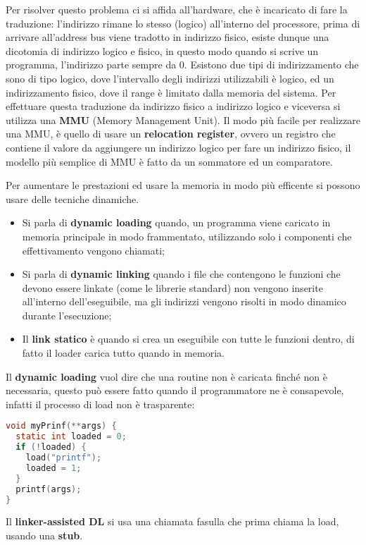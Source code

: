 \documentclass[12pt]{article}
\begin{document}
Per risolver questo problema ci si affida all'hardware, che \`e incaricato di fare la traduzione: l'indirizzo rimane lo stesso (logico) all'interno del processore, prima di arrivare all'address bus viene tradotto in indirizzo fisico, esiste dunque una dicotomia di indirizzo logico e fisico, in questo modo quando si scrive un programma, l'indirizzo parte sempre da 0. Esistono due tipi di indirizzamento che sono di tipo logico, dove l'intervallo degli indirizzi utilizzabili \`e logico, ed un indirizzamento fisico, dove il range \`e limitato dalla memoria del sistema. Per effettuare questa traduzione da indirizzo fisico a indirizzo logico e viceversa si utilizza una \textbf{MMU} (Memory Management Unit). Il modo pi\`u facile per realizzare una MMU, \`e quello di usare un \textbf{relocation register}, ovvero un registro che contiene il valore da aggiungere un indirizzo logico per fare un indirizzo fisico, il modello pi\`u semplice di MMU \`e fatto da un sommatore ed un comparatore.

Per aumentare le prestazioni ed usare la memoria in modo pi\`u efficente si possono usare delle tecniche dinamiche.
\begin{itemize}
  \item Si parla di \textbf{dynamic loading} quando, un programma viene caricato in memoria principale in modo frammentato, utilizzando solo i componenti che effettivamento vengono chiamati;
  \item Si parla di \textbf{dynamic linking} quando i file che contengono le funzioni che devono essere linkate (come le librerie standard) non vengono inserite all'interno dell'eseguibile, ma gli indirizzi vengono risolti in modo dinamico durante l'esecuzione;
  \item Il \textbf{link statico} \`e quando si crea un eseguibile con tutte le funzioni dentro, di fatto il loader carica tutto quando in memoria.
\end{itemize}
Il \textbf{dynamic loading} vuol dire che una routine non \`e caricata finch\'e non \`e necessaria, questo pu\`o essere fatto quando il programmatore ne \`e consapevole, infatti il processo di load non \`e trasparente:
\begin{lstlisting}[language=c]
void myPrinf(**args) {
  static int loaded = 0;
  if (!loaded) {
    load("printf");
    loaded = 1;
  }
  printf(args);
}
\end{lstlisting}
Il \textbf{linker-assisted DL} si usa una chiamata fasulla che prima chiama la load, usando una \textbf{stub}.
\end{document}
